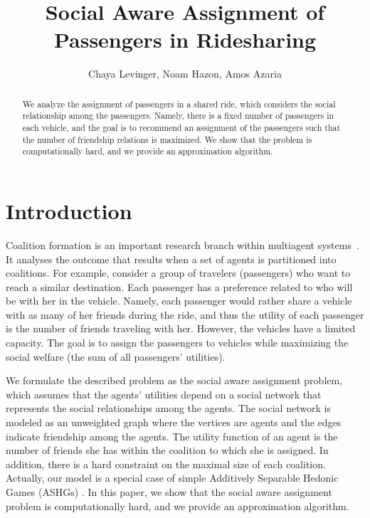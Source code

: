 \documentclass[letterpaper]{article} %
\title{Social Aware Assignment of Passengers in Ridesharing}
\author {
    Chaya Levinger, %
    Noam Hazon, %
    Amos Azaria%
}
\begin{document}
\maketitle

\begin{abstract}
    We analyze the assignment of passengers in a shared ride, which considers the social relationship among the passengers. Namely, there is a fixed number of passengers in each vehicle, and the goal is to recommend an assignment of the passengers such that the number of friendship relations is maximized. We show that the  problem is computationally hard, and we provide an approximation algorithm.
\end{abstract}


\section{Introduction}


Coalition formation is an important research branch within multiagent systems~\cite{chalkiadakis2011computational}.
It analyses the outcome that results when a set of agents is partitioned into coalitions. 
For example, consider a group of travelers (passengers) who want to reach a similar destination. Each passenger has a preference related to who will be with her in the vehicle. Namely, each passenger would rather share a vehicle with as many of her friends during the ride, and thus the utility of each passenger is the number of friends traveling with her.  However, the vehicles have a limited capacity. The goal is to assign the passengers to vehicles while maximizing the social welfare (the sum of all passengers' utilities).

We formulate the described problem as the social aware assignment problem, which assumes that the agents' utilities depend on a social network that represents the social relationships among the agents. The
social network is modeled as an unweighted graph where the
vertices are agents and the edges indicate friendship among
the agents. The utility function of an agent is the number
of friends she has within the coalition to which she is assigned.
In addition, there is a hard constraint on the maximal size of each coalition.
Actually, our model is a special case of simple Additively
Separable Hedonic Games (ASHGs) \cite{bogomolnaia2002stability}.
In this paper, we show that the social aware assignment problem is computationally hard, and we provide an approximation algorithm.
\end{document}
